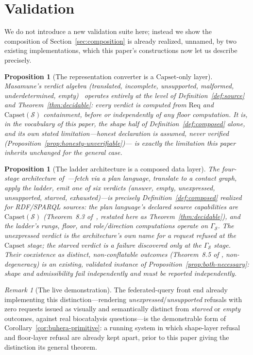 \documentclass[11pt,a4paper,twocolumn]{article}
\newtheorem{proposition}[theorem]{Proposition}
\theoremstyle{definition}
\theoremstyle{remark}
\newtheorem{remark}[theorem]{Remark}
\newcommand{\Capset}{\mathrm{Capset}}
\newcommand{\Src}{\mathcal{S}}
\newcommand{\Gph}{\Gamma}
\newcommand{\Req}{\mathrm{Req}}
\begin{document}
\section{Validation}
\label{sec:validation}

We do not introduce a new validation suite here; instead we show the composition
of Section~\ref{sec:composition} is already realized, unnamed, by two existing
implementations, which this paper's constructions now let us describe precisely.

\begin{proposition}[The representation converter is a $\Capset$-only layer]
\label{val:masamune}
Masamune's verdict algebra (translated, incomplete, unsupported, malformed,
underdetermined, empty)~\cite{masamune} operates entirely at the level of
Definition~\ref{def:source} and Theorem~\ref{thm:decidable}: every verdict is
computed from $\Req$ and $\Capset(\Src)$ containment, before or independently of
any floor computation. It is, in the vocabulary of this paper, the shape half of
Definition~\ref{def:composed} alone, and its own stated limitation---honest
declaration is assumed, never verified (Proposition~\ref{prop:honesty-unverifiable})---
is exactly the limitation this paper inherits unchanged for the general case.
\end{proposition}

\begin{proposition}[The ladder architecture is a composed data layer]
\label{val:ladder}
The four-stage architecture of~\cite{ladder}---fetch via a plan language,
translate to a contact graph, apply the ladder, emit one of six verdicts
(answer, empty, unexpressed, unsupported, starved, exhausted)---is precisely
Definition~\ref{def:composed} realized for RDF/SPARQL sources: the plan
language's declared source capabilities are $\Capset(\Src)$
(Theorem~8.3 of~\cite{ladder}, restated here as
Theorem~\ref{thm:decidable}), and the ladder's rungs, floor, and role/direction
computations operate on $\Gph_\Src$. The \emph{unexpressed} verdict is the
architecture's own name for a request refused at the $\Capset$ stage; the
\emph{starved} verdict is a failure discovered only at the $\Gph_\Src$ stage.
Their coexistence as distinct, non-conflatable outcomes (Theorem~8.5 of
\cite{ladder}, non-degeneracy) is an existing, validated instance of
Proposition~\ref{prop:both-necessary}: shape and admissibility fail
independently and must be reported independently.
\end{proposition}

\begin{remark}[The live demonstration]
The federated-query front end already implementing this
distinction---rendering \emph{unexpressed}/\emph{unsupported} refusals with
zero requests issued as visually and semantically distinct from
\emph{starved} or \emph{empty} outcomes, against real biocatalysis questions---is
the demonstrable form of Corollary~\ref{cor:buhera-primitive}: a running system
in which shape-layer refusal and floor-layer refusal are already
kept apart, prior to this paper giving the distinction its general theorem.
\end{remark}
\end{document}
